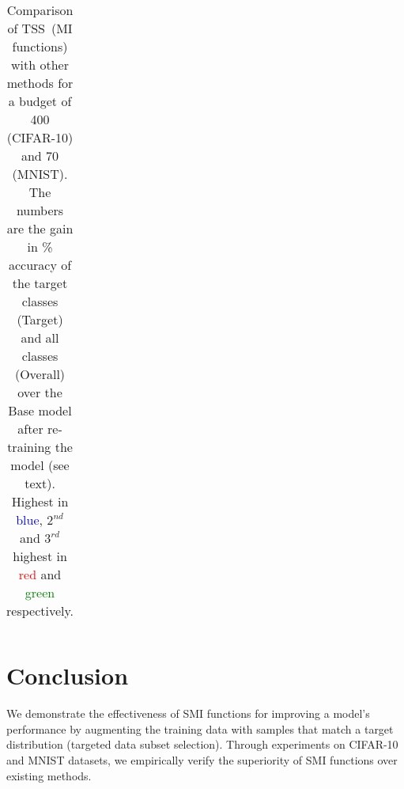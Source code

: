 \documentclass{article}
\newcommand{\modelss}{\mbox{\textsc{TSS}}}
\begin{document}
\begin{table}[ht]
\begin{center}
\begin{tabular}{lrrrr}
\hline
\end{tabular}

\caption{Comparison of \modelss\ (MI functions) with other methods for a budget of 400 (CIFAR-10) and 70 (MNIST). The numbers are the gain in \% accuracy of the target classes (Target) and all classes (Overall) over the Base model after re-training the model (see text). Highest in \textcolor{blue}{blue}, $2^{nd}$ and $3^{rd}$ highest in \textcolor{red}{red} and \textcolor{green}{green} respectively. }
\label{tab:cifar-mnist-results}
\end{center}
\end{table}

\section{Conclusion}
We demonstrate the effectiveness of SMI functions for improving a model's performance by augmenting the training data with samples that match a target distribution (targeted data subset selection). Through experiments on CIFAR-10 and MNIST datasets, we empirically verify the superiority of SMI functions over existing methods.

% 

\end{document}

